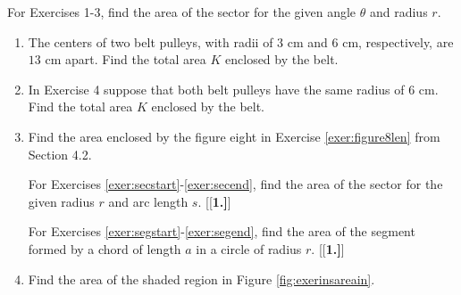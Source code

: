 \startexercises\label{sec4dot3}
\vspace{4mm}
{\small
\par\noindent For Exercises 1-3, find the area of the sector for the given angle $\theta$ and
radius $r$.
\begin{enumerate}[\bfseries 1.]
 \item The centers of two belt pulleys, with radii of $3$ cm and $6$ cm, respectively, are $13$ cm
  apart. Find the total area $K$ enclosed by the belt.
 \item In Exercise 4 suppose that both belt pulleys have the same radius of $6$ cm.
  Find the total area $K$ enclosed by the belt.
 \item Find the area enclosed by the figure eight in Exercise \ref{exer:figure8len} from
  Section 4.2.
\par\noindent For Exercises \ref{exer:secstart}-\ref{exer:secend}, find the area of the sector for
the given radius $r$ and arc length $s$.
[{[\bfseries 1.]}]
\par\noindent For Exercises \ref{exer:segstart}-\ref{exer:segend}, find the area of the segment
formed by a chord of length $a$ in a circle of radius $r$.
[{[\bfseries 1.]}]
 \item\label{exer:insareain} Find the area of the shaded region in Figure \ref{fig:exerinsareain}.
\begin{figure}[h]

\end{figure}
\end{enumerate}}
